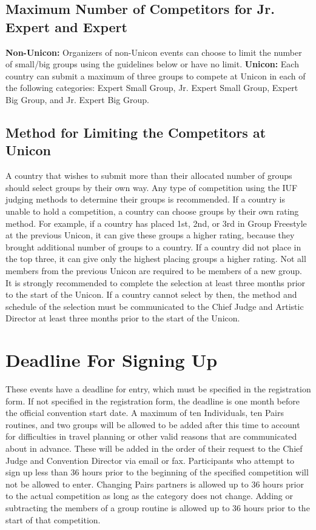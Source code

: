 \subsection{Maximum Number of Competitors for Jr. Expert and Expert}
\textbf{Non-Unicon:} Organizers of non-Unicon events can choose to limit the number of small/big groups using the guidelines below or have no limit.
\textbf{Unicon:} Each country can submit a maximum of three groups to compete at Unicon in each of the following categories: Expert Small Group, Jr. Expert Small Group, Expert Big Group, and Jr. Expert Big Group.

\subsection{Method for Limiting the Competitors at Unicon}
A country that wishes to submit more than their allocated number of groups should select groups by their own way.
Any type of competition using the IUF judging methods to determine their groups is recommended.
If a country is unable to hold a competition, a country can choose groups by their own rating method.
For example, if a country has placed 1st, 2nd, or 3rd in Group Freestyle at the previous Unicon, it can give these groups a higher rating, because they brought additional number of groups to a country.
If a country did not place in the top three, it can give only the highest placing groups a higher rating.
Not all members from the previous Unicon are required to be members of a new group.
It is strongly recommended to complete the selection at least three months prior to the start of the Unicon.
If a country cannot select by then, the method and schedule of the selection must be communicated to the Chief Judge and Artistic Director at least three months prior to the start of the Unicon.

\section{Deadline For Signing Up}
These events have a deadline for entry, which must be specified in the registration form.
If not specified in the registration form, the deadline is one month before the official convention start date.
A maximum of ten Individuals, ten Pairs routines, and two groups will be allowed to be added after this time to account for difficulties in travel planning or other valid reasons that are communicated about in advance.
These will be added in the order of their request to the Chief Judge and Convention Director via email or fax.
Participants who attempt to sign up less than 36 hours prior to the beginning of the specified competition will not be allowed to enter.
Changing Pairs partners is allowed up to 36 hours prior to the actual competition as long as the category does not change.
Adding or subtracting the members of a group routine is allowed up to 36 hours prior to the start of that competition.

